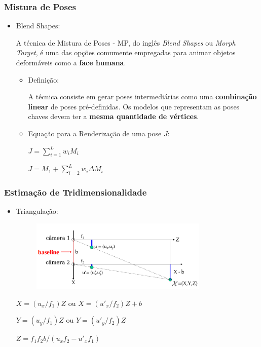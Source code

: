 \documentclass[brazil]{beamer}
\begin{document}
\begin{frame}
\frametitle{Mistura de Poses}
  \begin{itemize}
  	
  	\item Blend Shapes:
  	
  	A técnica de Mistura de Poses - MP, do inglês \textit{Blend Shapes} ou \textit{Morph Target}, é uma das opções comumente empregadas para animar objetos deformáveis como a \textbf{face humana}.
  	
 	 	\begin{itemize}
  	
 	 	\item Definição:
  	
 	 	A técnica consiste em gerar poses intermediárias como uma \textbf{combinação linear} de poses pré-definidas. Os modelos que representam as poses chaves devem ter a \textbf{mesma quantidade de vértices}.
  	
  	
  	    \item Equação para a Renderização de uma pose $J$:
      
   		   $J = \sum_{i=1}^L  w_i M_i$
      
   		   $J = M_1 + \sum_{i = 2}^L w_i \Delta M_i $

  \end{itemize} 

  \end{itemize} 
\end{frame}

\begin{frame}
\frametitle{Estimação de Tridimensionalidade}
  \begin{itemize}
      \item Triangulação:
      
      \begin{figure}
        \centering
        \includegraphics[width = 0.8\textwidth, keepaspectratio]{./img/TG_triangulation_pdf_washington_pt2.png}
      \end{figure}
      
      $X = (u_x/f_1)  Z$ ou $ X = (u'_x/f_2)  Z + b $
      
      $Y = (u_y/f_1) Z$ ou $ Y = (u'_y/f_2) Z$
      
      $Z = f_1  f_2  b / (u_x  f_2 - u'_x  f_1)$
      
  \end{itemize} 
\end{frame}
\end{document}
